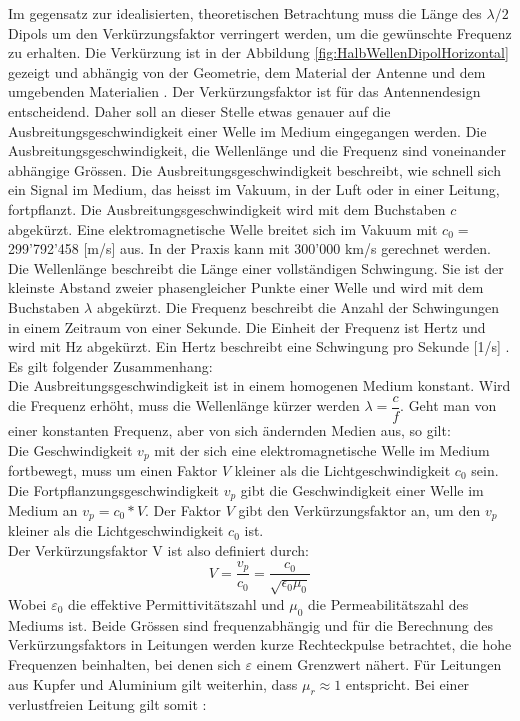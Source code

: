 \newpage
Im gegensatz zur idealisierten, theoretischen Betrachtung muss die Länge des $\lambda /2$ Dipols um den Verkürzungsfaktor verringert werden, um die gewünschte Frequenz zu erhalten. Die Verkürzung ist in der Abbildung \ref{fig:HalbWellenDipolHorizontal} gezeigt und abhängig von der Geometrie, dem Material der Antenne und dem umgebenden Materialien \cite{Hcuno}.
Der Verkürzungsfaktor ist für das Antennendesign entscheidend. Daher soll an dieser Stelle etwas genauer auf die Ausbreitungsgeschwindigkeit einer Welle im Medium eingegangen werden.
Die Ausbreitungsgeschwindigkeit, die Wellenlänge und die Frequenz sind voneinander abhängige Grössen. 
Die Ausbreitungsgeschwindigkeit beschreibt, wie schnell sich ein Signal im Medium, das heisst im Vakuum, in der Luft oder in einer Leitung, fortpflanzt. Die Ausbreitungsgeschwindigkeit wird mit dem Buchstaben $c$ abgekürzt. Eine elektromagnetische Welle breitet sich im
Vakuum mit $c_0 = $ 299'792’458 [m/s] aus. In der Praxis kann mit 300'000 km/s gerechnet werden.
Die Wellenlänge beschreibt die Länge einer vollständigen Schwingung. Sie ist der kleinste Abstand zweier phasengleicher Punkte einer Welle und wird mit dem Buchstaben $\lambda$ abgekürzt. Die Frequenz beschreibt die Anzahl der Schwingungen in einem Zeitraum von einer Sekunde. Die Einheit der Frequenz ist Hertz und wird mit Hz abgekürzt. Ein Hertz beschreibt eine Schwingung pro Sekunde [1/s] \cite{Verkuertzungsfaktor}.
Es gilt folgender Zusammenhang:\\
Die Ausbreitungsgeschwindigkeit ist in einem homogenen Medium konstant. Wird die Frequenz erhöht, muss die Wellenlänge kürzer werden $\lambda = \dfrac{c}{f}$. Geht man von einer konstanten Frequenz, aber von sich ändernden Medien aus, so gilt: \\
Die Geschwindigkeit $v_p$ mit der sich eine elektromagnetische Welle im Medium fortbewegt, muss um einen Faktor $V$ kleiner als die Lichtgeschwindigkeit $c_0$ sein.\\
Die Fortpflanzungsgeschwindigkeit $v_p$ gibt die Geschwindigkeit einer Welle im Medium an $v_p=c_0*V $. Der Faktor $V$ gibt den Verkürzungsfaktor an, um den $v_p$ kleiner als die Lichtgeschwindigkeit $c_0$ ist. \\
Der Verkürzungsfaktor V ist also definiert durch:
\begin{equation}
V=\dfrac{v_p}{c_0}=\dfrac{c_0}{\sqrt{\epsilon_0 \mu_0}}
\end{equation}
Wobei $\varepsilon_0$ die effektive Permittivitätszahl
 und $\mu_0$ die Permeabilitätszahl des Mediums ist. Beide Grössen sind frequenzabhängig und für die Berechnung des Verkürzungsfaktors in Leitungen werden kurze Rechteckpulse betrachtet, die hohe Frequenzen beinhalten, bei denen sich $\varepsilon$ einem Grenzwert nähert. Für Leitungen aus Kupfer und Aluminium gilt weiterhin, dass $\mu_r \approx 1$ entspricht. Bei einer verlustfreien Leitung gilt somit \cite{Verkuertzungsfaktor_wiki}:
